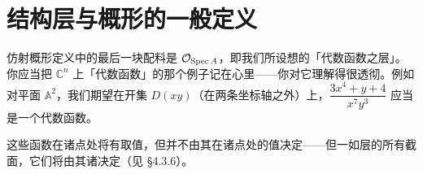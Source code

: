 
\chapter{结构层与概形的一般定义}
\label{ch:structure-sheaf-schemes}

仿射概形定义中的最后一块配料是\trStructureSheaf{} $\mathcal{O}_{\operatorname{Spec} A}$，即我们所设想的「代数函数之层」。你应当把 $\mathbb{C}^n$ 上「代数函数」的那个例子记在心里——你对它理解得很透彻。例如对平面 $\mathbb{A}^2$，我们期望在开集 $D(xy)$（在两条坐标轴之外）上，$\dfrac{3x^4+y+4}{x^7y^3}$ 应当是一个代数函数。

这些函数在诸点处将有取值，但并不由其在诸点处的值决定——但一如层的所有截面，它们将由其诸\trGerm{}决定（见 \S4.3.6）。






